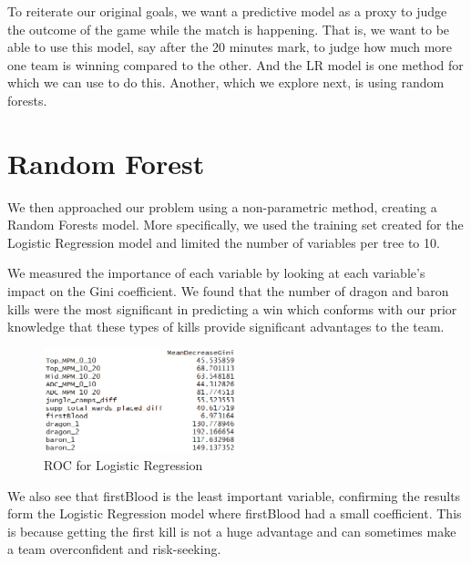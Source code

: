 \documentclass[runningheads]{llncs}
\begin{document}
	To reiterate our original goals, we want a predictive model as a proxy to judge the outcome of the game while the match is happening. That is, we want to be able to use this model, say after the 20 minutes mark, to judge how much more one team is winning compared to the other. And the LR model is one method for which we can use to do this. Another, which we explore next, is using random forests.
	
	\section{Random Forest}
	
	We then approached our problem using a non-parametric method, creating a Random Forests 
model. More specifically, we used the training set created for the Logistic Regression model and limited the number of variables per tree to 10. 

	We measured the importance of each variable by looking at each variable’s impact on the Gini coefficient. We found that the number of dragon and baron kills were the most significant in predicting a win which conforms with our prior knowledge that these types of kills provide significant advantages to the team.
	
	\begin{figure}[!htb]
		\centering
		\includegraphics[width=0.5\textwidth]{images/rf_importance.png}
		\caption{ROC for Logistic Regression}
	\end{figure}
	
	We also see that firstBlood is the least important variable, confirming the results form the Logistic Regression model where firstBlood had a small coefficient. This is because getting the first kill is not a huge advantage and can sometimes make a team overconfident and risk-seeking.
	
\end{document}
